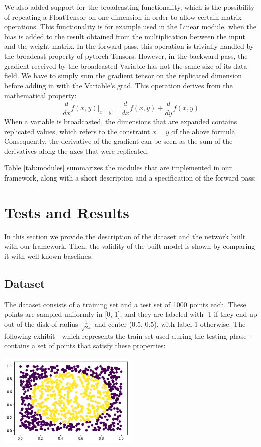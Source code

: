 \documentclass[10pt,conference,compsocconf]{IEEEtran}
\begin{document}
We also added support for the broadcasting functionality, which is the possibility of repeating a FloatTensor on one dimension in order to allow certain matrix operations. This functionality is for example used in the Linear module, when the bias is added to the result obtained from the multiplication between the input and the weight matrix. In the forward pass, this operation is trivially handled by the broadcast property of pytorch Tensors. However, in the backward pass, the gradient received by the broadcasted Variable has not the same size of its data field. We have to simply sum the gradient tensor on the replicated dimension before adding in with the Variable's grad. This operation derives from the mathematical property:
\[\frac{d}{dx}f(x,y)|_{x=y} = \frac{d}{dx}f(x,y) + \frac{d}{dy}f(x,y)\]
When a variable is broadcasted, the dimensions that are expanded contains replicated values, which refers to the constraint $x=y$ of the above formula. Consequently, the derivative of the gradient can be seen as the sum of the derivatives along the axes that were replicated.

Table \ref{tab:modules} summarizes the modules that are implemented in our framework, along with a short description and a specification of the forward pass:


\section{Tests and Results}
\label{sec:Test}
In this section we provide the description of the dataset and the network built with our framework. Then, the validity of the built model is shown by comparing it with well-known baselines.

\subsection{Dataset}
The dataset consists of a training set and a test set of 1000 points each. These points are sampled uniformly in [0, 1], and they are labeled with -1 if they end up out of the disk of radius \( \frac{1}{\sqrt{2\pi}} \) and center (0.5, 0.5), with label 1 otherwise. The following exhibit - which represents the train set used during the testing phase - contains a set of points that satisfy these properties:

\begin{center}
	\captionsetup{type=figure}
	\includegraphics[width=0.5\textwidth]{img/dataset.png}
	\label{fig:dataset}
\end{center} 
\end{document}
